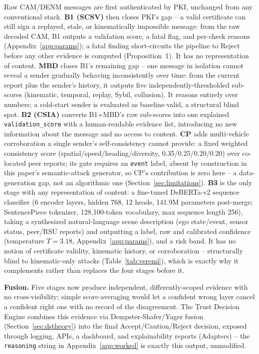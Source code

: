 \documentclass[conference]{IEEEtran}
\begin{document}
Raw CAM/DENM messages are first authenticated by PKI, unchanged from any conventional stack. \textbf{B1 (SCSV)} then closes PKI's gap -- a valid certificate can still sign a replayed, stale, or kinematically impossible message: from the raw decoded CAM, B1 outputs a validation score, a fatal flag, and per-check reasons (Appendix~\ref{app:params}); a fatal finding short-circuits the pipeline to Reject before any other evidence is computed (Proposition~1). It has no representation of content. \textbf{MBD} closes B1's remaining gap -- one message in isolation cannot reveal a sender gradually behaving inconsistently over time: from the current report plus the sender's history, it outputs five independently-thresholded sub-scores (kinematic, temporal, replay, Sybil, collusion). It reasons entirely over numbers; a cold-start sender is evaluated as baseline-valid, a structural blind spot. \textbf{B2 (CSIA)} converts B1+MBD's raw sub-scores into one explained \texttt{validation\_score} with a human-readable evidence list, introducing no new information about the message and no access to content. \textbf{CP} adds multi-vehicle corroboration a single sender's self-consistency cannot provide: a fixed weighted consistency score (spatial/speed/heading/diversity, 0.35/0.25/0.20/0.20) over co-located peer reports; its gate requires an \texttt{event} label, absent by construction in this paper's semantic-attack generator, so CP's contribution is zero here -- a data-generation gap, not an algorithmic one (Section~\ref{sec:limitations}). \textbf{B3} is the only stage with any representation of content: a fine-tuned DeBERTa-v2 sequence classifier (6 encoder layers, hidden 768, 12 heads, 141.9M parameters post-merge; SentencePiece tokenizer, 128,100-token vocabulary, max sequence length 256), taking a synthesized natural-language scene description (ego state/event, sensor status, peer/RSU reports) and outputting a label, raw and calibrated confidence (temperature $T{=}3.18$, Appendix~\ref{app:params}), and a risk band. It has no notion of certificate validity, kinematic history, or corroboration -- structurally blind to kinematic-only attacks (Table~\ref{tab:veremi}), which is exactly why it complements rather than replaces the four stages before it.

\textbf{Fusion.} Five stages now produce independent, differently-scoped evidence with no cross-visibility; simple score-averaging would let a confident wrong layer cancel a confident right one with no record of the disagreement. The Trust Decision Engine combines this evidence via Dempster-Shafer/Yager fusion (Section~\ref{sec:dstheory}) into the final Accept/Caution/Reject decision, exposed through logging, APIs, a dashboard, and explainability reports (Adapters) -- the \texttt{reasoning} string in Appendix~\ref{app:worked} is exactly this output, unmodified.
\end{document}
